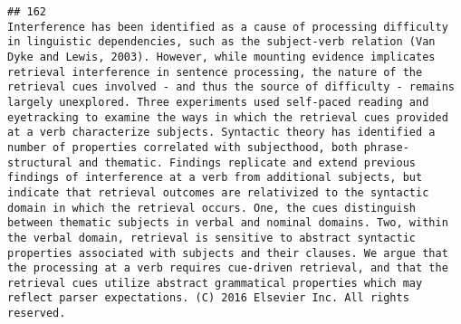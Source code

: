 \documentclass[
  english,
  man]{apa6}
\begin{document}
\begin{verbatim}
## 162                                                                                                                                                                                                                                                                                                                                                                                                                                                                                                                                                                                                                                                                                                                                                                                                                                                                                                                                                                                                                                                                                                                                                                                                                                                                                                                                                    Interference has been identified as a cause of processing difficulty in linguistic dependencies, such as the subject-verb relation (Van Dyke and Lewis, 2003). However, while mounting evidence implicates retrieval interference in sentence processing, the nature of the retrieval cues involved - and thus the source of difficulty - remains largely unexplored. Three experiments used self-paced reading and eyetracking to examine the ways in which the retrieval cues provided at a verb characterize subjects. Syntactic theory has identified a number of properties correlated with subjecthood, both phrase-structural and thematic. Findings replicate and extend previous findings of interference at a verb from additional subjects, but indicate that retrieval outcomes are relativized to the syntactic domain in which the retrieval occurs. One, the cues distinguish between thematic subjects in verbal and nominal domains. Two, within the verbal domain, retrieval is sensitive to abstract syntactic properties associated with subjects and their clauses. We argue that the processing at a verb requires cue-driven retrieval, and that the retrieval cues utilize abstract grammatical properties which may reflect parser expectations. (C) 2016 Elsevier Inc. All rights reserved.

\end{verbatim}
\end{document}
